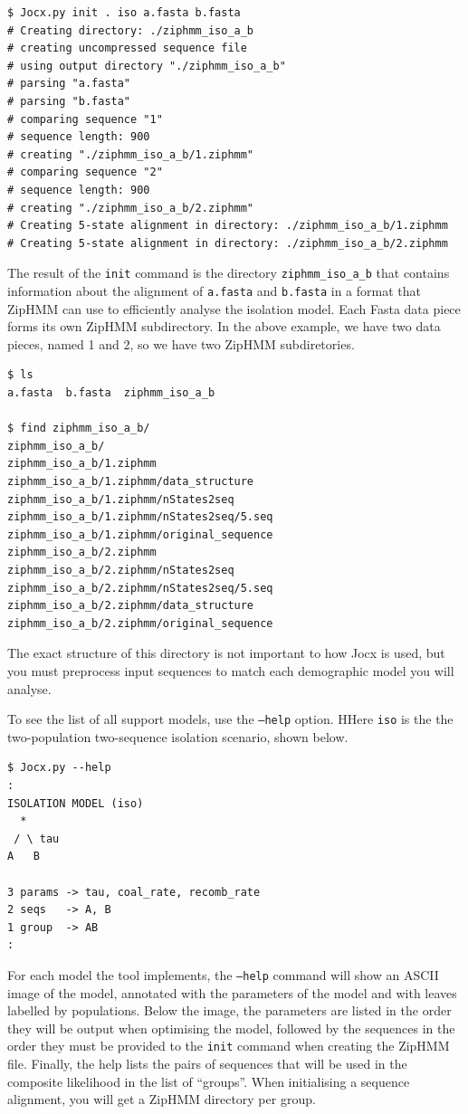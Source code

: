 \documentclass[graybox]{svmult}
\begin{document}
 {\scriptsize{}\begin{verbatim}
$ Jocx.py init . iso a.fasta b.fasta
# Creating directory: ./ziphmm_iso_a_b
# creating uncompressed sequence file
# using output directory "./ziphmm_iso_a_b"
# parsing "a.fasta"
# parsing "b.fasta"
# comparing sequence "1"
# sequence length: 900
# creating "./ziphmm_iso_a_b/1.ziphmm"
# comparing sequence "2"
# sequence length: 900
# creating "./ziphmm_iso_a_b/2.ziphmm"
# Creating 5-state alignment in directory: ./ziphmm_iso_a_b/1.ziphmm
# Creating 5-state alignment in directory: ./ziphmm_iso_a_b/2.ziphmm
\end{verbatim}}

The result of the \texttt{init} command is the directory \texttt{ziphmm\_iso\_a\_b} that contains information about the alignment of \texttt{a.fasta} and \texttt{b.fasta} in a format that ZipHMM can use to efficiently analyse the isolation model.  Each Fasta data piece forms its own ZipHMM subdirectory.  In the above example, we have two data pieces, named 1 and 2, so we have two ZipHMM subdiretories.

 {\scriptsize{}\begin{verbatim}
$ ls
a.fasta  b.fasta  ziphmm_iso_a_b

$ find ziphmm_iso_a_b/
ziphmm_iso_a_b/
ziphmm_iso_a_b/1.ziphmm
ziphmm_iso_a_b/1.ziphmm/data_structure
ziphmm_iso_a_b/1.ziphmm/nStates2seq
ziphmm_iso_a_b/1.ziphmm/nStates2seq/5.seq
ziphmm_iso_a_b/1.ziphmm/original_sequence
ziphmm_iso_a_b/2.ziphmm
ziphmm_iso_a_b/2.ziphmm/nStates2seq
ziphmm_iso_a_b/2.ziphmm/nStates2seq/5.seq
ziphmm_iso_a_b/2.ziphmm/data_structure
ziphmm_iso_a_b/2.ziphmm/original_sequence
\end{verbatim}}

The exact structure of this directory is not important to how Jocx is used, but you must preprocess input sequences to match each demographic model you will analyse.

To see the list of all support models, use the \texttt{--help} option. HHere \texttt{iso} is the the two-population two-sequence isolation scenario, shown below.

 {\scriptsize{}\begin{verbatim}
$ Jocx.py --help
:
ISOLATION MODEL (iso)
  *
 / \ tau
A   B

3 params -> tau, coal_rate, recomb_rate
2 seqs   -> A, B
1 group  -> AB
:
\end{verbatim}}

For each model the tool implements, the \texttt{--help} command will show an ASCII image of the model, annotated with the parameters of the model and with leaves labelled by populations. Below the image, the parameters are listed in the order they will be output when optimising the model, followed by the sequences in the order they must be provided to the \texttt{init} command when creating the ZipHMM file. Finally, the help lists the pairs of sequences that will be used in the composite likelihood in the list of ``groups''. When initialising a sequence alignment, you will get a ZipHMM directory per group.
\end{document}
